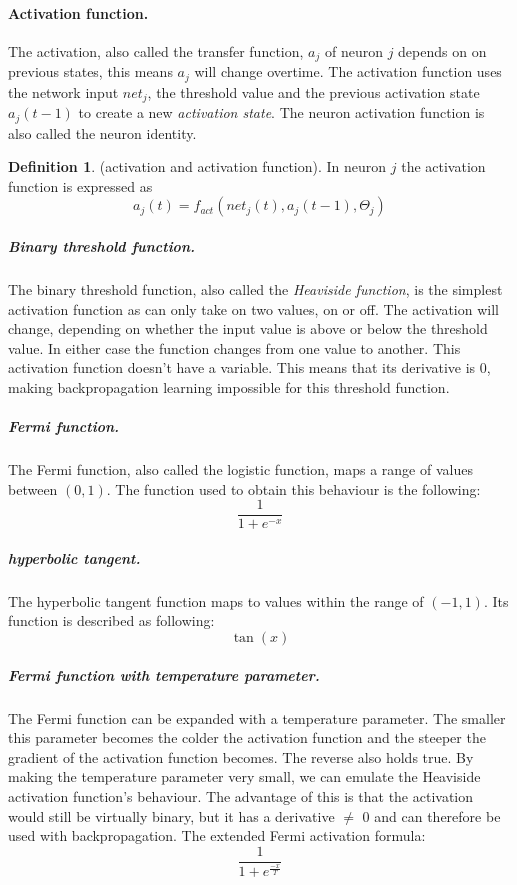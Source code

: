 \documentclass[pdftex,a4paper,12pt,twoside]{report}
\theoremstyle{plain} \newtheorem{theorem}{Theorem} \newtheorem{proposition}{Proposition} \newtheorem{lemma}{Lemma} \newtheorem*{corollary}{Corollary}
\theoremstyle{definition} \newtheorem{definition}{Definition} \newtheorem{conjecture}{Conjecture} \newtheorem*{example}{Example} \newtheorem{algorithm}{Algorithm}
\theoremstyle{remark} \newtheorem*{remark}{Remark} \newtheorem*{note}{Note} \newtheorem{case}{Case}
\begin{document}
\paragraph{Activation function.}
\label{par:activationfunction}
The activation, also called the transfer function, $a_j$ of neuron $j$ depends on on previous states, this means $a_j$ will change overtime. The activation function uses the network input $net_j$, the threshold value and the previous activation state $a_j(t-1)$ to create a new \emph{activation state}. The neuron activation function is also called the neuron identity.
\begin{definition}
(activation and activation function). In neuron $j$ the activation function is expressed as
\begin{equation}
a_j(t) = f _{act}(net_j(t),a_j(t-1),\Theta_j)
\end{equation}
\end{definition}
\subparagraph{Binary threshold function.}
The binary threshold function, also called the \emph{Heaviside function}, is the simplest activation function as can only take on two values, on or off. The activation will change, depending on whether the input value is above or below the threshold value. In either case the function changes from one value to another. This activation function doesn't have a variable. This means that its derivative is 0, making backpropagation learning impossible for this threshold function. 
\subparagraph{Fermi function.}
The Fermi function, also called the logistic function, maps a range of values between $(0,1)$. The function used to obtain this behaviour is the following:
\begin{equation}
\displaystyle \frac{1}{1+e^{-x}}
\end{equation}
\subparagraph{hyperbolic tangent.}
The hyperbolic tangent function maps to values within the range of $(-1,1)$. Its function is described as following:
\begin{equation}
\tan(x)
\end{equation}
\subparagraph{Fermi function with temperature parameter.}
The Fermi function can be expanded with a temperature parameter. The smaller this parameter becomes the colder the activation function and the steeper the gradient of the activation function becomes. The reverse also holds true. By making the temperature parameter very small, we can emulate the Heaviside activation function's behaviour. The advantage of this is that the activation would still be virtually binary, but it has a derivative $\neq$ 0 and can therefore be used with backpropagation. The extended Fermi activation formula:
\begin{equation}
\displaystyle \frac{1}{1+e^{\frac{-x}{T}}}
\end{equation}
\end{document}
